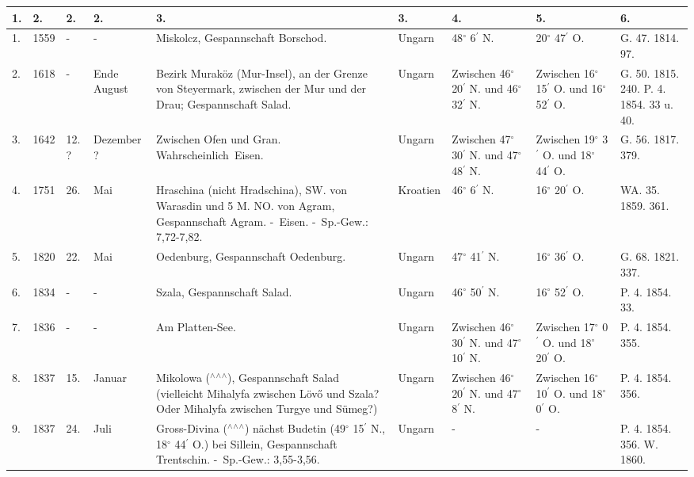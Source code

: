 \documentclass[a4paper, 11pt, oneside, polutonikogreek, german]{article}
\begin{document}
\begin{table}[!ht]
    \centering
    \begin{tabular}{|l|l|l|l|l|l|l|l|l|}
    \hline
        1. & 2. & 2. & 2. & 3. & 3. & 4. & 5. & 6. \\ \hline
        1. & 1559 & - & - & Miskolcz, Gespannschaft Borschod. & Ungarn & 48$^\circ$ 6$^\prime$ N. & 20$^\circ$ 47$^\prime$ O. & G. 47. 1814. 97. \\ \hline
        2. & 1618 & - & Ende August & Bezirk Muraköz (Mur-Insel), an der Grenze von Steyermark, zwischen der Mur und der Drau; Gespannschaft Salad. & Ungarn & Zwischen 46$^\circ$ 20$^\prime$ N. und 46$^\circ$ 32$^\prime$ N. & Zwischen 16$^\circ$ 15$^\prime$ O. und 16$^\circ$ 52$^\prime$ O. & G. 50. 1815. 240. P. 4. 1854. 33 u. 40. \\ \hline
        3. & 1642 & 12. ? & Dezember ? & Zwischen Ofen und Gran. Wahrscheinlich Eisen. & Ungarn & Zwischen 47$^\circ$ 30$^\prime$ N. und 47$^\circ$ 48$^\prime$ N. & Zwischen 19$^\circ$ 3$^\prime$ O. und 18$^\circ$ 44$^\prime$ O. & G. 56. 1817. 379. \\ \hline
        4. & 1751 & 26. & Mai & Hraschina (nicht Hradschina), SW. von Warasdin und 5 M. NO. von Agram, Gespannschaft Agram. - Eisen. - Sp.-Gew.: 7,72-7,82. & Kroatien & 46$^\circ$ 6$^\prime$ N. & 16$^\circ$ 20$^\prime$ O. & WA. 35. 1859. 361. \\ \hline
        5. & 1820 & 22. & Mai & Oedenburg, Gespannschaft Oedenburg. & Ungarn & 47$^\circ$ 41$^\prime$ N. & 16$^\circ$ 36$^\prime$ O. & G. 68. 1821. 337. \\ \hline
        6. & 1834 & - & - & Szala, Gespannschaft Salad. & Ungarn & 46$^\circ$ 50$^\prime$ N. & 16$^\circ$ 52$^\prime$ O. & P. 4. 1854. 33. \\ \hline
        7. & 1836 & - & - & Am Platten-See. & Ungarn & Zwischen 46$^\circ$ 30$^\prime$ N. und 47$^\circ$ 10$^\prime$ N. & Zwischen 17$^\circ$ 0$^\prime$ O. und 18$^\circ$ 20$^\prime$ O. & P. 4. 1854. 355. \\ \hline
        8. & 1837 & 15. & Januar & Mikolowa ($^\wedge$$^\wedge$$^\wedge$), Gespannschaft Salad (vielleicht Mihalyfa zwischen Lövő und Szala? Oder Mihalyfa zwischen Turgye und Sümeg?) & Ungarn & Zwischen 46$^\circ$ 20$^\prime$ N. und 47$^\circ$ 8$^\prime$ N. & Zwischen 16$^\circ$ 10$^\prime$ O. und 18$^\circ$ 0$^\prime$ O. & P. 4. 1854. 356. \\ \hline
        9. & 1837 & 24. & Juli & Gross-Divina ($^\wedge$$^\wedge$$^\wedge$) nächst Budetin (49$^\circ$ 15$^\prime$ N., 18$^\circ$ 44$^\prime$ O.) bei Sillein, Gespannschaft Trentschin. - Sp.-Gew.: 3,55-3,56. & Ungarn & - & - & P. 4. 1854. 356. W. 1860. \\ \hline

\end{tabular}
\end{table}
\end{document}

